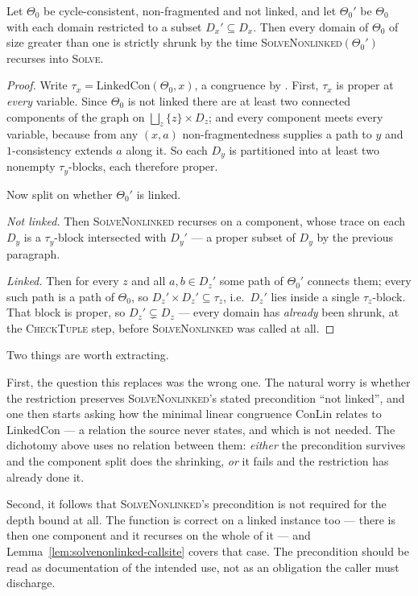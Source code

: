 \begin{lemma}\label{lem:solvenonlinked-callsite}
Let $\Theta_{0}$ be cycle-consistent, non-fragmented and not linked, and let
$\Theta_{0}'$ be $\Theta_{0}$ with each domain restricted to a subset
$D_{x}'\subseteq D_{x}$. Then every domain of $\Theta_{0}$ of size greater than
one is strictly shrunk by the time \textsc{SolveNonlinked}$(\Theta_{0}')$
recurses into \textsc{Solve}.
\end{lemma}

\begin{proof}
Write $\tau_{x}=\mathrm{LinkedCon}(\Theta_{0},x)$, a congruence by
\cite[Lem.~6.2]{ZhukJACM}. First, $\tau_{x}$ is proper at \emph{every} variable.
Since $\Theta_{0}$ is not linked there are at least two connected components of
the graph on $\bigsqcup_{z}\{z\}\times D_{z}$; and every component meets every
variable, because from any $(x,a)$ non-fragmentedness supplies a path to $y$ and
$1$-consistency extends $a$ along it. So each $D_{y}$ is partitioned into at
least two nonempty $\tau_{y}$-blocks, each therefore proper.

Now split on whether $\Theta_{0}'$ is linked.

\emph{Not linked.} Then \textsc{SolveNonlinked} recurses on a component, whose
trace on each $D_{y}$ is a $\tau_{y}$-block intersected with $D_{y}'$ --- a
proper subset of $D_{y}$ by the previous paragraph.

\emph{Linked.} Then for every $z$ and all $a,b\in D_{z}'$ some path of
$\Theta_{0}'$ connects them; every such path is a path of $\Theta_{0}$, so
$D_{z}'\times D_{z}'\subseteq\tau_{z}$, i.e.\ $D_{z}'$ lies inside a single
$\tau_{z}$-block. That block is proper, so $D_{z}'\subsetneq D_{z}$ --- every
domain has \emph{already} been shrunk, at the \textsc{CheckTuple} step, before
\textsc{SolveNonlinked} was called at all.
\end{proof}

\begin{remark}\label{rem:callsite-moral}
Two things are worth extracting.

First, the question this replaces was the wrong one. The natural worry is
whether the restriction preserves \textsc{SolveNonlinked}'s stated precondition
``not linked'', and one then starts asking how the minimal linear congruence
$\mathrm{ConLin}$ relates to $\mathrm{LinkedCon}$ --- a relation the source
never states, and which is not needed. The dichotomy above uses no relation
between them: \emph{either} the precondition survives and the component split
does the shrinking, \emph{or} it fails and the restriction has already done it.

Second, it follows that \textsc{SolveNonlinked}'s precondition is not required
for the depth bound at all. The function is correct on a linked instance too ---
there is then one component and it recurses on the whole of it --- and
Lemma~\ref{lem:solvenonlinked-callsite} covers that case. The precondition
should be read as documentation of the intended use, not as an obligation the
caller must discharge.
\end{remark}

